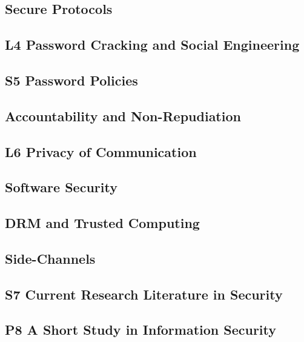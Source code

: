 \subsection{Secure Protocols}


\subsection{L4 Password Cracking and Social Engineering}


\subsection{S5 Password Policies}


\subsection{Accountability and Non-Repudiation}


\subsection{L6 Privacy of Communication}


\subsection{Software Security}


\subsection{DRM and Trusted Computing}


\subsection{Side-Channels}


\subsection{S7 Current Research Literature in Security}


\subsection{P8 A Short Study in Information Security}


